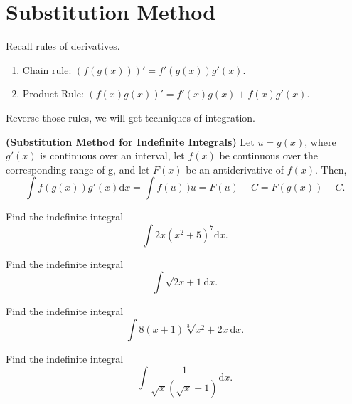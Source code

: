 
\hypertarget{substitution-method}{%
\section{Substitution Method}\label{substitution-method}}

Recall rules of derivatives.

\begin{enumerate}[sepno]
\item
  Chain rule: \((f(g(x)))'=f'(g(x))g'(x)\).
\item
  Product Rule: \((f(x)g(x))'=f'(x)g(x)+f(x)g'(x)\).
\end{enumerate}

Reverse those rules, we will get techniques of integration.

\begin{theorem}

\textbf{(Substitution Method for Indefinite Integrals)} Let \(u=g(x)\),
where \(g'(x)\) is continuous over an interval, let \(f(x)\) be
continuous over the corresponding range of g, and let \(F(x)\) be an
antiderivative of \(f(x).\) Then,
\[\int f(g(x))g'(x)\mathrm{d} x =\int f(u)\,)u=F(u)+C= F(g(x))+C.\]

\end{theorem}

\begin{example}

Find the indefinite integral \[\int 2x(x^2+5)^7\mathrm{d} x.\]

\end{example}
\vspace*{6\baselineskip}

\begin{example}

Find the indefinite integral \[\int \sqrt{2x+1}\mathrm{d} x.\]

\end{example}
\vspace*{6\baselineskip}

\begin{example}

Find the indefinite integral
\[\int 8(x+1)\sqrt[3]{x^2+2x}\mathrm{d} x.\]

\end{example}
\vspace*{6\baselineskip}

\begin{example}

Find the indefinite integral
\[\int \dfrac{1}{\sqrt{x}(\sqrt{x}+1)}\mathrm{d} x.\]

\end{example}
\vspace*{6\baselineskip}

